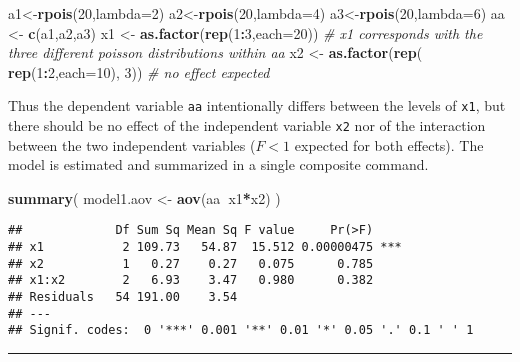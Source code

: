 \documentclass[]{book}
\newenvironment{Shaded}{\begin{snugshade}}{\end{snugshade}}
\newcommand{\CommentTok}[1]{\textcolor[rgb]{0.56,0.35,0.01}{\textit{#1}}}
\newcommand{\DataTypeTok}[1]{\textcolor[rgb]{0.13,0.29,0.53}{#1}}
\newcommand{\DecValTok}[1]{\textcolor[rgb]{0.00,0.00,0.81}{#1}}
\newcommand{\KeywordTok}[1]{\textcolor[rgb]{0.13,0.29,0.53}{\textbf{#1}}}
\newcommand{\NormalTok}[1]{#1}
\newcommand{\OperatorTok}[1]{\textcolor[rgb]{0.81,0.36,0.00}{\textbf{#1}}}
\newcommand{\StringTok}[1]{\textcolor[rgb]{0.31,0.60,0.02}{#1}}
\begin{document}
\begin{Shaded}
\begin{Highlighting}[]
\NormalTok{a1<-}\KeywordTok{rpois}\NormalTok{(}\DecValTok{20}\NormalTok{,}\DataTypeTok{lambda=}\DecValTok{2}\NormalTok{)}
\NormalTok{a2<-}\KeywordTok{rpois}\NormalTok{(}\DecValTok{20}\NormalTok{,}\DataTypeTok{lambda=}\DecValTok{4}\NormalTok{) }
\NormalTok{a3<-}\KeywordTok{rpois}\NormalTok{(}\DecValTok{20}\NormalTok{,}\DataTypeTok{lambda=}\DecValTok{6}\NormalTok{) }
\NormalTok{aa <-}\StringTok{ }\KeywordTok{c}\NormalTok{(a1,a2,a3) }
\NormalTok{x1 <-}\StringTok{ }\KeywordTok{as.factor}\NormalTok{(}\KeywordTok{rep}\NormalTok{(}\DecValTok{1}\OperatorTok{:}\DecValTok{3}\NormalTok{,}\DataTypeTok{each=}\DecValTok{20}\NormalTok{)) }
\CommentTok{# x1 corresponds with the three different poisson distributions within aa}
\NormalTok{x2 <-}\StringTok{ }\KeywordTok{as.factor}\NormalTok{(}\KeywordTok{rep}\NormalTok{( }\KeywordTok{rep}\NormalTok{(}\DecValTok{1}\OperatorTok{:}\DecValTok{2}\NormalTok{,}\DataTypeTok{each=}\DecValTok{10}\NormalTok{), }\DecValTok{3}\NormalTok{)) }\CommentTok{# no effect expected}
\end{Highlighting}
\end{Shaded}

Thus the dependent variable \texttt{aa} intentionally differs between the levels of \texttt{x1}, but there should be no effect of the independent variable \texttt{x2} nor of the interaction between the two independent variables (\(F<1\) expected for both effects). The model is estimated and summarized in a single composite command.

\begin{Shaded}
\begin{Highlighting}[]
\KeywordTok{summary}\NormalTok{( model1.aov <-}\StringTok{ }\KeywordTok{aov}\NormalTok{(aa}\OperatorTok{~}\NormalTok{x1}\OperatorTok{*}\NormalTok{x2) )}
\end{Highlighting}
\end{Shaded}

\begin{verbatim}
##             Df Sum Sq Mean Sq F value     Pr(>F)    
## x1           2 109.73   54.87  15.512 0.00000475 ***
## x2           1   0.27    0.27   0.075      0.785    
## x1:x2        2   6.93    3.47   0.980      0.382    
## Residuals   54 191.00    3.54                       
## ---
## Signif. codes:  0 '***' 0.001 '**' 0.01 '*' 0.05 '.' 0.1 ' ' 1
\end{verbatim}

\begin{center}\rule{0.5\linewidth}{0.5pt}\end{center}
\end{document}
